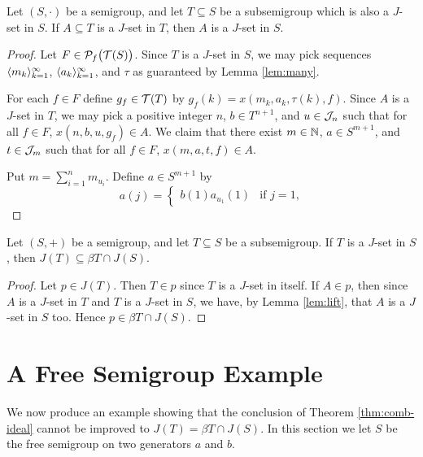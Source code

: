 \begin{lem}
  \label{lem:lift}
  Let $(S, \cdot)$ be a semigroup, and let $T \subseteq S$ be a subsemigroup which is also a $J$-set in $S$.
  If $A \subseteq T$ is a $J$-set in $T$, then $A$ is a $J$-set in $S$.
\end{lem}
\begin{proof}
  Let $F \in \mathcal{P}_f\bigl( \mathcal{T}(S) \bigr)$.
  Since $T$ is a $J$-set in $S$, we may pick sequences $\langle m_k \rangle_{k=1}^\infty$, $\langle a_k \rangle_{k=1}^\infty$, and $\tau$ as guaranteed by Lemma \ref{lem:many}.

  For each $f \in F$ define $g_f \in \mathcal{T}(T)$ by $g_f(k) = x(m_k, a_k, \tau(k), f)$. 
  Since $A$ is a $J$-set in $T$, we may pick a positive integer $n$, $b \in T^{n+1}$, and $u \in \mathcal{J}_n$ such that for all $f \in F$, $x(n, b, u, g_f) \in A$.
  We claim that there exist $m \in \mathbb{N}$, $a \in S^{m+1}$, and $t \in \mathcal{J}_m$ such that for all $f \in F$, $x(m, a, t, f) \in A$.

  Put $m = \sum_{i=1}^n m_{u_i}$. 
  Define $a \in S^{m+1}$ by
  \[
    a(j) = 
    \begin{cases}
      b(1)a_{u_1}(1) & \mbox{if $j = 1$,} 
    \end{cases}
  \]
\end{proof}

\begin{thm}
  \label{thm:comb-ideal}
  Let $(S, +)$ be a semigroup, and let $T \subseteq S$ be a subsemigroup.
  If $T$ is a $J$-set in $S$, then $J(T) \subseteq \beta T \cap J(S)$.
\end{thm}
\begin{proof}
  Let $p \in J(T)$.
  Then $T \in p$ since $T$ is a $J$-set in itself.
  If $A \in p$, then since $A$ is a $J$-set in $T$ and $T$ is a $J$-set in $S$, we have, by Lemma \ref{lem:lift}, that $A$ is a $J$-set in $S$ too.
  Hence $p \in \beta T \cap J(S)$. 
\end{proof}

\section{A Free Semigroup Example}
\label{sec:example}

We now produce an example showing that the conclusion of Theorem \ref{thm:comb-ideal} cannot be improved to $J(T) = \beta T \cap J(S)$.
In this section we let $S$ be the free semigroup on two generators $a$ and $b$.

